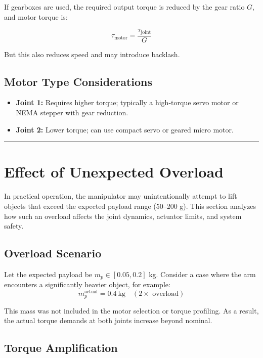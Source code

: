 \documentclass[a4paper,12pt]{article}
\begin{document}
If gearboxes are used, the required output torque is reduced by the gear ratio $G$, and motor torque is:

\[
\tau_{\text{motor}} = \frac{\tau_{\text{joint}}}{G}
\]

But this also reduces speed and may introduce backlash.

\subsection*{Motor Type Considerations}

\begin{itemize}
    \item \textbf{Joint 1:} Requires higher torque; typically a high-torque servo motor or NEMA stepper with gear reduction.
    \item \textbf{Joint 2:} Lower torque; can use compact servo or geared micro motor.

\end{itemize}

\vspace{1em}
\noindent\rule{\linewidth}{0.6pt}
\vspace{1em}

\section{Effect of Unexpected Overload} \label{sec:overload}

In practical operation, the manipulator may unintentionally attempt to lift objects that exceed the expected payload range (50–200 g). This section analyzes how such an overload affects the joint dynamics, actuator limits, and system safety.

\subsection*{Overload Scenario}

Let the expected payload be $m_p \in [0.05, 0.2]$ kg. Consider a case where the arm encounters a significantly heavier object, for example:
\[
m_p^{\text{actual}} = 0.4~\text{kg} \quad (\text{2$\times$ overload})
\]

This mass was not included in the motor selection or torque profiling. As a result, the actual torque demands at both joints increase beyond nominal.

\subsection*{Torque Amplification}
\end{document}
